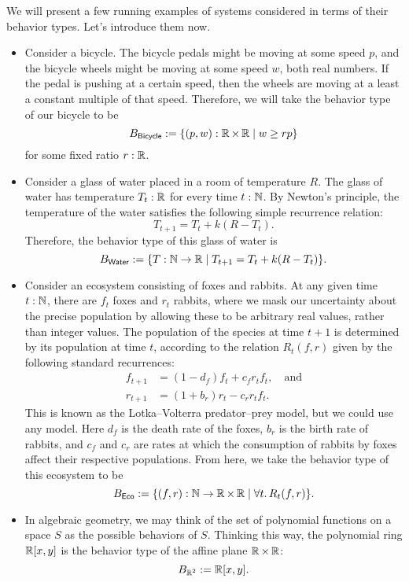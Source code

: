 \begin{ex}
We will present a few running examples of systems considered in terms of their behavior types. Let's introduce them now.

\begin{itemize}
    \item Consider a bicycle. The bicycle pedals might be moving at some speed $p$, and the bicycle wheels might be moving at some speed $w$, both real numbers. If the pedal is pushing at a certain speed, then the wheels are moving at a least a constant multiple of that speed. Therefore, we will take the behavior type of our bicycle to be
    $$B_{\mathsf{{Bicycle}}} := \{(p, w) : \operatorname{\mathbb{R}} \times \operatorname{\mathbb{R}} \mid w \geq rp \}$$
    for some fixed ratio $r : \operatorname{\mathbb{R}}$.
    
    \item Consider a glass of water placed in a room of temperature $R$. The glass of water has temperature $T_t : \operatorname{\mathbb{R}}$ for every time $t : \operatorname{\mathbb{N}}$. By Newton's principle, the temperature of the water satisfies the following simple recurrence relation:
    $$T_{t + 1} = T_t + k(R - T_t).$$
    Therefore, the behavior type of this glass of water is
    $$B_{\mathsf{{Water}}} := \{ T : \operatorname{\mathbb{N}} \to \operatorname{\mathbb{R}} \mid T_{t + 1} = T_t + k(R - T_t)\}.$$
    
    \item Consider an ecosystem consisting of foxes and rabbits. At any given time $t : \operatorname{\mathbb{N}}$, there are $f_t$ foxes and $r_t$ rabbits, where we mask our uncertainty about the precise population by allowing these to be arbitrary real values, rather than integer values. The population of the species at time $t + 1$ is determined by its population at time $t$, according to the relation  $R_t(f, r)$ given by the following standard recurrences:
    \begin{align*}
        f_{t + 1} &= (1 - d_f)f_t + c_f r_t f_t, \quad\text{and} \\
        r_{t + 1} &= (1 + b_r)r_t - c_r r_t f_t.
    \end{align*}
    This is known as the Lotka--Volterra predator--prey model, but we could use any model. Here $d_f$ is the death rate of the foxes, $b_r$ is the birth rate of rabbits, and $c_f$ and $c_r$ are rates at which the consumption of rabbits by foxes affect their respective populations.   From here, we take the behavior type of this ecosystem to be
    $$B_{\mathsf{{Eco}}} := \{(f, r) : \operatorname{\mathbb{N}} \to \operatorname{\mathbb{R}} \times \operatorname{\mathbb{R}} \mid \forall t.\, R_t(f, r)\}.$$
    
    \item In algebraic geometry, we may think of the set of polynomial functions on a space $S$ as the possible behaviors of $S$. Thinking this way, the polynomial ring $\operatorname{\mathbb{R}}[x, y]$ is the behavior type of the affine plane $\operatorname{\mathbb{R}} \times \operatorname{\mathbb{R}}$:
    $$B_{\operatorname{\mathbb{R}}^2} := \operatorname{\mathbb{R}}[x, y].$$
\end{itemize}
\end{ex}

